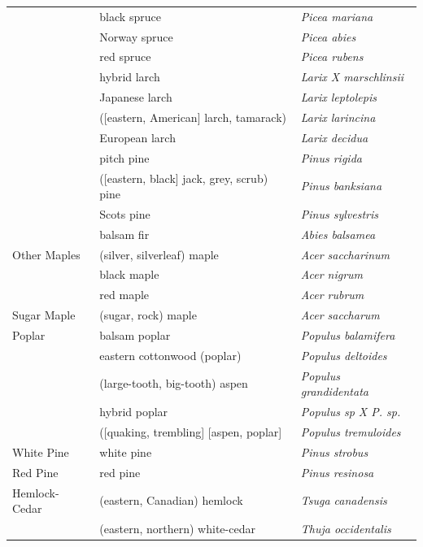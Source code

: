 \message{ !name(pspdistfit_article.tex)}\documentclass{article}
\begin{document}
\begin{table}
{\begin{tabular}{lll}
      &    black spruce &   \emph{Picea mariana} \\
      &    Norway spruce &   \emph{Picea abies} \\
      &    red spruce &   \emph{Picea rubens} \\
      &    hybrid larch &   \emph{Larix X marschlinsii} \\
      &    Japanese larch &   \emph{Larix leptolepis} \\
      &    ([eastern, American] larch, tamarack) &   \emph{Larix larincina} \\
      &    European larch &   \emph{Larix decidua} \\
      &    pitch pine &   \emph{Pinus rigida} \\
      &    ([eastern, black] jack, grey, scrub) pine &   \emph{Pinus banksiana} \\
      &    Scots pine &   \emph{Pinus sylvestris} \\
      &    balsam fir &   \emph{Abies balsamea} \\
Other Maples        &     (silver, silverleaf) maple &   \emph{Acer saccharinum} \\
        &     black maple &   \emph{Acer nigrum} \\
        &     red maple &   \emph{Acer rubrum} \\
Sugar Maple        &     (sugar, rock) maple &   \emph{Acer saccharum} \\
Poplar        &     balsam poplar &   \emph{Populus balamifera} \\
       &     eastern cottonwood (poplar) &   \emph{Populus deltoides} \\
       &     (large-tooth, big-tooth) aspen &   \emph{Populus grandidentata} \\
       &     hybrid poplar &   \emph{Populus sp X P. sp.} \\
       &     ([quaking, trembling] [aspen, poplar] &   \emph{Populus tremuloides} \\
White Pine        &     white pine &   \emph{Pinus strobus} \\
Red Pine        &     red pine &   \emph{Pinus resinosa} \\
Hemlock-Cedar    &    (eastern, Canadian) hemlock &   \emph{Tsuga canadensis} \\
    &    (eastern, northern) white-cedar &   \emph{Thuja occidentalis} \\
\bottomrule
\end{tabular}
}%
\end{table}
\end{document}

